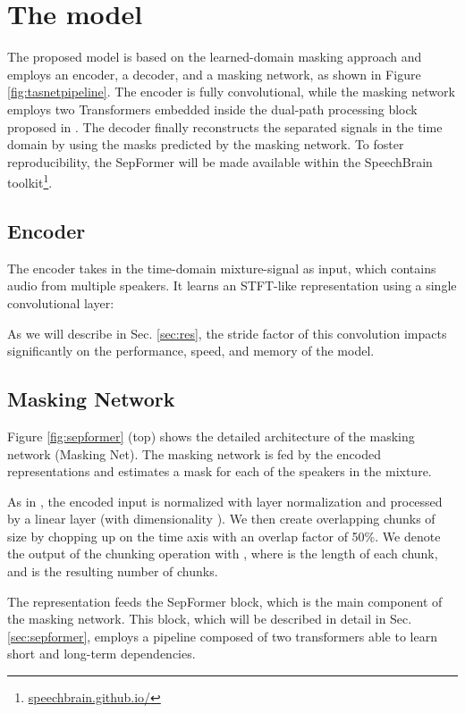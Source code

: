 \documentclass{article}
\begin{document}
\section{The model}
The proposed model is based on the learned-domain masking approach \cite{venkataramani2017endtoend, luo2018convtasnet, liu2019divide, luo2020dualpath, shi2019furcanext, nachmani2020voice, tzinis2020sudo,  dptn} and employs an encoder, a decoder, and a masking network, as shown in Figure \ref{fig:tasnetpipeline}.
The encoder is fully convolutional, while the masking network employs two Transformers embedded inside the dual-path processing block proposed in \cite{luo2020dualpath}. The decoder finally reconstructs the separated signals in the time domain by using the masks predicted by the masking network. To foster reproducibility, the SepFormer will be made available within the SpeechBrain toolkit\footnote{\url{speechbrain.github.io/}}. 




\subsection{Encoder}
The encoder takes in the time-domain  mixture-signal  as input, which contains audio from multiple speakers. 
It learns an STFT-like representation  using a single convolutional layer:

As we will describe in Sec. \ref{sec:res}, the stride factor of this convolution impacts significantly on the performance, speed, and memory of the model. 


\subsection{Masking Network}
Figure \ref{fig:sepformer} (top) shows the detailed architecture of the masking network (Masking Net).
The masking network  is fed by the encoded representations  and estimates a mask  for each of the  speakers in the mixture. 

As in \cite{luo2018convtasnet}, the encoded input  is normalized with layer normalization \cite{layernorm} and processed by a linear layer (with dimensionality ). 
We then create overlapping chunks of size  by chopping up  on the time axis with an overlap factor of 50\%. We denote the output of the chunking operation with , where  is the length of each chunk, and  is the resulting number of chunks. 

The representation  feeds the SepFormer block, which is the main component of the masking network. This block, which will be described in detail in Sec. \ref{sec:sepformer}, employs a pipeline composed of two transformers able to learn short and long-term dependencies.
\end{document}

